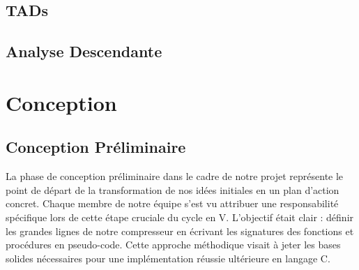 \documentclass[12pt]{article}
\begin{document}
    \subsection{TADs}
    
    
    
    
    
    

    \subsection{Analyse Descendante}

    

    \newpage


    \section{Conception}

    \subsection{Conception Préliminaire}
    La phase de conception préliminaire dans le cadre de notre projet représente le point de départ de la transformation de nos idées initiales en un plan d'action concret. Chaque membre de notre équipe s'est vu attribuer une responsabilité spécifique lors de cette étape cruciale du cycle en V. L'objectif était clair : définir les grandes lignes de notre compresseur en écrivant les signatures des fonctions et procédures en pseudo-code. Cette approche méthodique visait à jeter les bases solides nécessaires pour une implémentation réussie ultérieure en langage C.\newline
    
    
    
    
    
    
    
\end{document}
